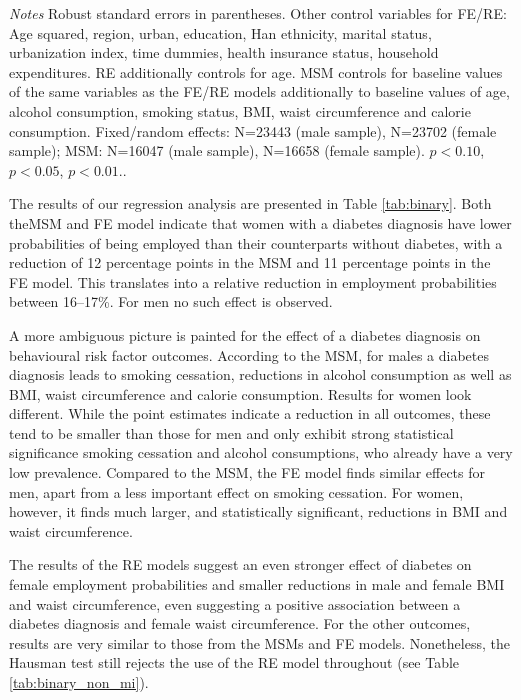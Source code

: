 \begin{table}[p]
\begin{adjustbox}{max width=\linewidth, center}
\begin{threeparttable}
{\begin{tabular}{l*{6}{S
S}}
\bottomrule
\end{tabular}
\begin{tablenotes}
\item \textit{Notes} Robust standard errors in parentheses. Other control variables for FE/RE: Age squared, region, urban, education, Han ethnicity, marital status, urbanization index, time dummies, health insurance status, household expenditures. RE additionally controls for age. MSM controls for baseline values of the same variables as the FE/RE models additionally to baseline values of age, alcohol consumption, smoking status, BMI, waist circumference and calorie consumption.  Fixed/random effects: N=23443 (male sample), N=23702 (female sample); MSM:  N=16047 (male sample), N=16658 (female sample). \sym{*} \(p<0.10\), \sym{**} \(p<0.05\), \sym{***} \(p<0.01\)..
\end{tablenotes}
}
\end{threeparttable}
\end{adjustbox}

\end{table}
The results of our regression analysis are presented in Table \ref{tab:binary}. Both the\ac{MSM} and \ac{FE} model indicate that women with a diabetes diagnosis have lower probabilities of being employed than their counterparts without diabetes, with a reduction of 12 percentage points in the \ac{MSM} and 11 percentage points in the \ac{FE} model. This translates into a relative reduction in employment probabilities between 16--17\%. For men no such effect is observed.



A more ambiguous picture is painted for the effect of a diabetes diagnosis on behavioural risk factor outcomes. According to the \ac{MSM}, for males a diabetes diagnosis leads to smoking cessation, reductions in alcohol consumption as well as \ac{BMI}, waist circumference and calorie consumption. Results for women look different. While the point estimates indicate a reduction in all outcomes, these tend to be smaller than those for men and only exhibit strong statistical significance smoking cessation and alcohol consumptions, who already have a very low prevalence. Compared to the \ac{MSM}, the \ac{FE} model finds similar effects for men, apart from a less important effect on smoking cessation.	For women, however, it finds much larger, and statistically significant, reductions in \ac{BMI} and waist circumference. 

The results of the \ac{RE} models suggest an even stronger effect of diabetes on female employment probabilities and  smaller reductions in male and female \ac{BMI} and waist circumference, even suggesting a positive association between a diabetes diagnosis and female waist circumference. For the other outcomes, results are very similar to those from the \acp{MSM} and \ac{FE} models. Nonetheless, the Hausman test still rejects the use of the \ac{RE} model throughout (see Table \ref{tab:binary_non_mi}).

